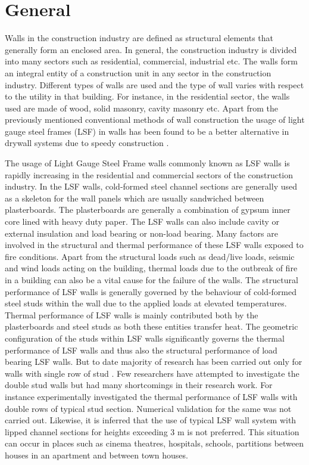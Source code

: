 \section{General}
Walls in the construction industry are defined as structural elements that generally form an enclosed area. In general, the construction industry is divided into many sectors such as residential, commercial, industrial etc. The walls form an integral entity of a construction unit in any sector in the construction industry.  Different types of walls are used and the type of wall varies with respect to the utility in that building. For instance, in the residential sector, the walls used are made of wood, solid masonry, cavity masonry etc.  Apart from the previously mentioned conventional methods of wall construction the usage of light gauge steel frames (LSF) in walls has been found to be a better alternative in drywall systems due to speedy construction . 

The usage of Light Gauge Steel Frame walls commonly known as LSF walls is rapidly increasing in the residential and commercial sectors of the construction industry. In the LSF walls, cold-formed steel channel sections are generally used as a skeleton for the wall panels which are usually sandwiched between plasterboards. The plasterboards are generally a combination of gypsum inner core lined with heavy duty paper. The LSF walls can also include cavity or external insulation and load bearing or non-load bearing. Many factors are involved in the structural and thermal performance of these LSF walls exposed to fire conditions. Apart from the structural loads such as dead/live loads, seismic and wind loads acting on the building, thermal loads due to the outbreak of fire in a building can also be a vital cause for the failure of the walls.  The structural performance of LSF walls is generally governed by the behaviour of cold-formed steel studs within the wall due to the applied loads at elevated temperatures. Thermal performance of LSF walls is mainly contributed both by the plasterboards and steel studs as both these entities transfer heat. The geometric configuration of the studs within LSF walls significantly governs the thermal performance of LSF walls and thus also the structural performance of load bearing LSF walls. But to date majority of research has been carried out only for walls with single row of stud . Few researchers have attempted to investigate the double stud walls but had many shortcomings in their research work. For instance \citet{Kodur2006} experimentally investigated the thermal performance of LSF walls with double rows of typical stud section. Numerical validation for the same was not carried out. Likewise, it is inferred that the use of typical LSF wall system with lipped channel sections for heights exceeding 3 m is not preferred. This situation can occur in places such as cinema theatres, hospitals, schools, partitions between houses in an apartment and between town houses.

